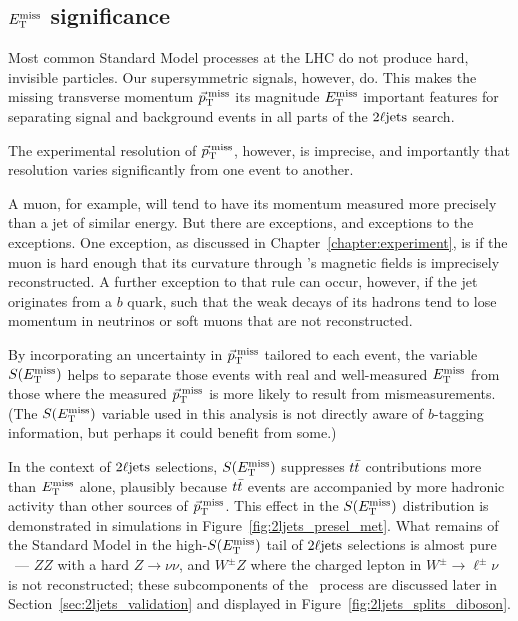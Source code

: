 \subsection{\texorpdfstring{$E_\mathrm{T}^\mathrm{miss}$}{ETmiss} significance}
\label{sec:2ljets_metsig}
Most common Standard Model processes at the LHC do not produce hard,
invisible particles.
Our supersymmetric signals, however, do.
This makes the missing transverse momentum $\vec p_\mathrm{T}^\mathrm{\:miss}$ its magnitude $E_\mathrm{T}^\mathrm{miss}$
important features for separating signal and background events in all parts
of the $2\ell\mathrm{jets}$ search.

The experimental resolution of $\vec p_\mathrm{T}^\mathrm{\:miss}$, however, is imprecise, and
importantly that resolution varies significantly from one event to another.

A muon, for example, will tend to have its momentum measured more precisely
than a jet of similar energy.
But there are exceptions, and exceptions to the exceptions.
One exception, as discussed in Chapter~\ref{chapter:experiment}, is if the muon
is hard enough that its curvature through \atlas's magnetic fields is
imprecisely reconstructed.
A further exception to that rule can occur, however, if the jet originates from a
$b$ quark, such that the weak decays of its hadrons tend to lose momentum in
neutrinos or soft muons that are not reconstructed.

By incorporating an uncertainty in $\vec p_\mathrm{T}^\mathrm{\:miss}$ tailored to each event, the
variable $S(E_\mathrm{T}^\mathrm{miss})$ helps to separate those events with real and well-measured
$E_\mathrm{T}^\mathrm{miss}$ from those where the measured $\vec p_\mathrm{T}^\mathrm{\:miss}$ is more likely to result from
mismeasurements.
(The $S(E_\mathrm{T}^\mathrm{miss})$ variable used in this analysis is not directly
aware of $b$-tagging information, but perhaps it could benefit from some.)

In the context of $2\ell\mathrm{jets}$ selections, $S(E_\mathrm{T}^\mathrm{miss})$ suppresses $t\bar t$
contributions more than $E_\mathrm{T}^\mathrm{miss}$ alone, plausibly because $t\bar t$ events are
accompanied by more hadronic activity than other sources of $\vec p_\mathrm{T}^\mathrm{\:miss}$.
This effect in the $S(E_\mathrm{T}^\mathrm{miss})$ distribution is demonstrated in simulations in
Figure~\ref{fig:2ljets_presel_met}.
What remains of the Standard Model in the high-$S(E_\mathrm{T}^\mathrm{miss})$ tail of $2\ell\mathrm{jets}$
selections is almost pure \diboson\ --- $ZZ$ with a hard $Z\to \nu\nu$,
and $W^\pm Z$ where the charged lepton in $W^\pm\to\ell^\pm\nu$
is not reconstructed; these subcomponents of the \diboson\ process are discussed
later in Section~\ref{sec:2ljets_validation} and displayed in
Figure~\ref{fig:2ljets_splits_diboson}.

